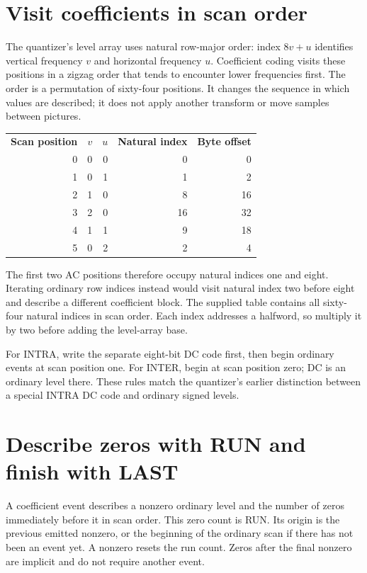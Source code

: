 \section{Visit coefficients in scan order}
The quantizer's level array uses natural row-major order: index $8v+u$ identifies
vertical frequency $v$ and horizontal frequency $u$. Coefficient coding visits
these positions in a zigzag order that tends to encounter lower frequencies first.
The order is a permutation of sixty-four positions. It changes the sequence in
which values are described; it does not apply another transform or move samples
between pictures.

\begin{center}
\begin{tabular}{rrrrr}
\textbf{Scan position} & \textbf{$v$} & \textbf{$u$} & \textbf{Natural index} & \textbf{Byte offset}\\
0 & 0 & 0 & 0 & 0\\
1 & 0 & 1 & 1 & 2\\
2 & 1 & 0 & 8 & 16\\
3 & 2 & 0 & 16 & 32\\
4 & 1 & 1 & 9 & 18\\
5 & 0 & 2 & 2 & 4
\end{tabular}
\end{center}
The first two AC positions therefore occupy natural indices one and eight.
Iterating ordinary row indices instead would visit natural index two before
eight and describe a different coefficient block. The supplied table contains
all sixty-four natural indices in scan order. Each index addresses a halfword,
so multiply it by two before adding the level-array base.

For INTRA, write the separate eight-bit DC code first, then begin ordinary events
at scan position one. For INTER, begin at scan position zero; DC is an ordinary
level there. These rules match the quantizer's earlier distinction between a
special INTRA DC code and ordinary signed levels.

\section{Describe zeros with RUN and finish with LAST}
A coefficient event describes a nonzero ordinary level and the number of zeros
immediately before it in scan order. This zero count is RUN. Its origin is the
previous emitted nonzero, or the beginning of the ordinary scan if there has
not been an event yet. A nonzero resets the run count. Zeros after the final
nonzero are implicit and do not require another event.

